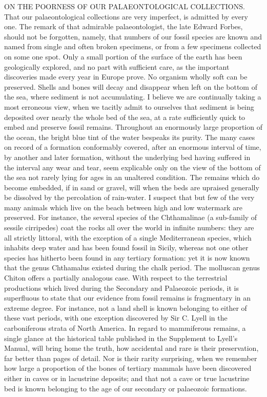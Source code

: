 ON THE POORNESS OF OUR PALAEONTOLOGICAL COLLECTIONS.
That our palaeontological collections are very imperfect, is admitted by every one. The remark of that admirable palaeontologist, the late Edward Forbes, should not be forgotten, namely, that numbers of our fossil species are known and named from single and often broken specimens, or from a few specimens collected on some one spot. Only a small portion of the surface of the earth has been geologically explored, and no part with sufficient care, as the important discoveries made every year in Europe prove. No organism wholly soft can be preserved. Shells and bones will decay and disappear when left on the bottom of the sea, where sediment is not accumulating. I believe we are continually taking a most erroneous view, when we tacitly admit to ourselves that sediment is being deposited over nearly the whole bed of the sea, at a rate sufficiently quick to embed and preserve fossil remains. Throughout an enormously large proportion of the ocean, the bright blue tint of the water bespeaks its purity. The many cases on record of a formation conformably covered, after an enormous interval of time, by another and later formation, without the underlying bed having suffered in the interval any wear and tear, seem explicable only on the view of the bottom of the sea not rarely lying for ages in an unaltered condition. The remains which do become embedded, if in sand or gravel, will when the beds are upraised generally be dissolved by the percolation of rain-water. I suspect that but few of the very many animals which live on the beach between high and low watermark are preserved. For instance, the several species of the Chthamalinae (a sub-family of sessile cirripedes) coat the rocks all over the world in infinite numbers: they are all strictly littoral, with the exception of a single Mediterranean species, which inhabits deep water and has been found fossil in Sicily, whereas not one other species has hitherto been found in any tertiary formation: yet it is now known that the genus Chthamalus existed during the chalk period. The molluscan genus Chiton offers a partially analogous case.
With respect to the terrestrial productions which lived during the Secondary and Palaeozoic periods, it is superfluous to state that our evidence from fossil remains is fragmentary in an extreme degree. For instance, not a land shell is known belonging to either of these vast periods, with one exception discovered by Sir C. Lyell in the carboniferous strata of North America. In regard to mammiferous remains, a single glance at the historical table published in the Supplement to Lyell's Manual, will bring home the truth, how accidental and rare is their preservation, far better than pages of detail. Nor is their rarity surprising, when we remember how large a proportion of the bones of tertiary mammals have been discovered either in caves or in lacustrine deposits; and that not a cave or true lacustrine bed is known belonging to the age of our secondary or palaeozoic formations.
